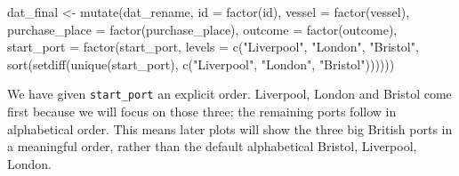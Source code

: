\documentclass[
  english,
  letterpaper,
]{book}
\newenvironment{Shaded}{\begin{snugshade}}{\end{snugshade}}
\newcommand{\AttributeTok}[1]{\textcolor[rgb]{0.40,0.45,0.13}{#1}}
\newcommand{\FunctionTok}[1]{\textcolor[rgb]{0.28,0.35,0.67}{#1}}
\newcommand{\NormalTok}[1]{\textcolor[rgb]{0.00,0.23,0.31}{#1}}
\newcommand{\OtherTok}[1]{\textcolor[rgb]{0.00,0.23,0.31}{#1}}
\newcommand{\StringTok}[1]{\textcolor[rgb]{0.13,0.47,0.30}{#1}}
\begin{document}
\begin{Shaded}
\begin{Highlighting}[]
\NormalTok{dat\_final }\OtherTok{\textless{}{-}} \FunctionTok{mutate}\NormalTok{(dat\_rename,}
                    \AttributeTok{id             =} \FunctionTok{factor}\NormalTok{(id),}
                    \AttributeTok{vessel         =} \FunctionTok{factor}\NormalTok{(vessel),}
                    \AttributeTok{purchase\_place =} \FunctionTok{factor}\NormalTok{(purchase\_place),}
                    \AttributeTok{outcome        =} \FunctionTok{factor}\NormalTok{(outcome),}
                    \AttributeTok{start\_port     =} \FunctionTok{factor}\NormalTok{(start\_port,}
                                            \AttributeTok{levels =} \FunctionTok{c}\NormalTok{(}\StringTok{"Liverpool"}\NormalTok{,}
                                                       \StringTok{"London"}\NormalTok{,}
                                                       \StringTok{"Bristol"}\NormalTok{,}
                                                       \FunctionTok{sort}\NormalTok{(}\FunctionTok{setdiff}\NormalTok{(}\FunctionTok{unique}\NormalTok{(start\_port),}
                                                                    \FunctionTok{c}\NormalTok{(}\StringTok{"Liverpool"}\NormalTok{, }\StringTok{"London"}\NormalTok{, }\StringTok{"Bristol"}\NormalTok{))))))}
\end{Highlighting}
\end{Shaded}

We have given \texttt{start\_port} an explicit order. Liverpool, London
and Bristol come first because we will focus on those three; the
remaining ports follow in alphabetical order. This means later plots
will show the three big British ports in a meaningful order, rather than
the default alphabetical Bristol, Liverpool, London.
\end{document}
